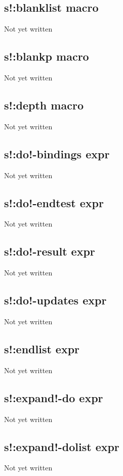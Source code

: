 \documentclass[a4paper,11pt]{article}
\begin{document}
{\subsection{\ttfamily s!:blanklist macro}
   Not yet written

\subsection{\ttfamily s!:blankp macro}
   Not yet written

\subsection{\ttfamily s!:depth macro}
   Not yet written

\subsection{\ttfamily s!:do!-bindings expr}
   Not yet written

\subsection{\ttfamily s!:do!-endtest expr}
   Not yet written

\subsection{\ttfamily s!:do!-result expr}
   Not yet written

\subsection{\ttfamily s!:do!-updates expr}
   Not yet written

\subsection{\ttfamily s!:endlist expr}
   Not yet written

\subsection{\ttfamily s!:expand!-do expr}
   Not yet written

\subsection{\ttfamily s!:expand!-dolist expr}
   Not yet written

}
\end{document}

